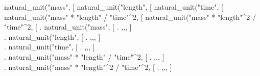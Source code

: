 \beginmaximasession
natural_unit("mass", [%
natural_unit("length", [%
natural_unit("time", [%
natural_unit("mass" * "length" / "time"^2, [%
natural_unit("mass" * "length"^2 / "time"^2, [%
\maximatexsession
{}.  natural_unit("mass", [%
.  \left[ m_p,\linebreak[0],\linebreak[0],\linebreak[0],\linebreak[0] \right] \\
.  natural_unit("length", [%
.  \left[ \frac{e^{2}\*m_p}{c^{2}\*m_e^{2}},\linebreak[0],\linebreak[0],\linebreak[0],\linebreak[0] \right] \\
.  natural_unit("time", [%
.  \left[ \frac{e^{2}\*m_p}{c^{3}\*m_e^{2}},\linebreak[0],\linebreak[0],\linebreak[0],\linebreak[0] \right] \\
.  natural_unit("mass" * "length" / "time"^2, [%
.  \left[ \frac{c^{4}\*m_e\*m_p}{e^{2}},\linebreak[0],\linebreak[0],\linebreak[0],\linebreak[0] \right] \\
.  natural_unit("mass" * "length"^2 / "time"^2, [%
.  \left[ c^{2}\*m_p,\linebreak[0],\linebreak[0],\linebreak[0],\linebreak[0] \right] \\
\endmaximasession

